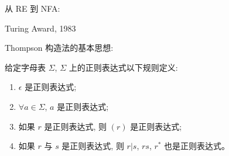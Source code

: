 \begin{frame}{}
  \begin{center}
    从 RE 到 NFA: 
  \end{center}
  
  \pause
  \vspace{0.20cm}
  \begin{center}
    Turing Award, 1983
  \end{center}

  
\end{frame}

\begin{frame}{}
  \begin{center}
    Thompson 构造法的基本思想: 
  \end{center}

  \begin{definition}[正则表达式]
    给定字母表 $\Sigma$, $\Sigma$ 上的正则表达式以下规则定义:
    \begin{enumerate}[(1)]
      \item $\epsilon$ 是正则表达式;
      \item $\forall a \in \Sigma$, $a$ 是正则表达式;
      \item 如果 $r$ 是正则表达式, 则 $(r)$ 是正则表达式;
      \item 如果 $r$ 与 $s$ 是正则表达式, 则 $r|s$, $rs$, $r^{\ast}$ 也是正则表达式。
    \end{enumerate}
  \end{definition}
\end{frame}

